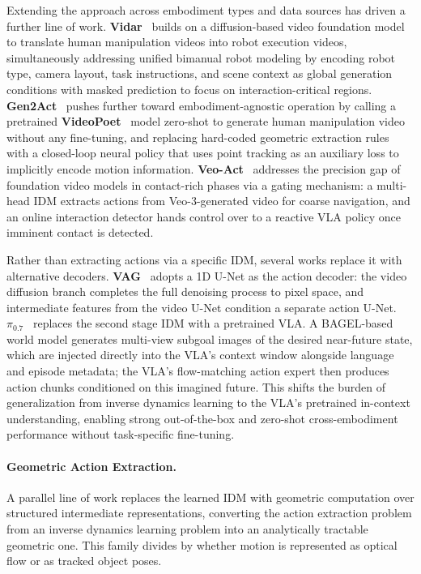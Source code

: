 Extending the approach across embodiment types and data sources has driven a further line of work. \textbf{Vidar}~\cite{vidar} builds on a diffusion-based video foundation model to translate human manipulation videos into robot execution videos, simultaneously addressing unified bimanual robot modeling by encoding robot type, camera layout, task instructions, and scene context as global generation conditions with masked prediction to focus on interaction-critical regions. \textbf{Gen2Act}~\cite{bharadhwaj2024gen2act} pushes further toward embodiment-agnostic operation by calling a pretrained \textbf{VideoPoet}~\cite{VideoPoet} model zero-shot to generate human manipulation video without any fine-tuning, and replacing hard-coded geometric extraction rules with a closed-loop neural policy that uses point tracking as an auxiliary loss to implicitly encode motion information.
\textbf{Veo-Act}~\cite{zhang2026veoact} addresses the precision gap of foundation video models in contact-rich phases via a gating mechanism: a multi-head IDM extracts actions from Veo-3-generated video for coarse navigation, and an online interaction detector hands control over to a reactive VLA policy once imminent contact is detected.

Rather than extracting actions via a specific IDM, several works replace it with alternative decoders. \textbf{VAG}~\cite{lang2026vag} adopts a 1D U-Net as the action decoder: the video diffusion branch completes the full denoising process to pixel space, and intermediate features from the video U-Net condition a separate action U-Net. \textbf{$\pi_{0.7}$}~\cite{pi0.7} replaces the second stage IDM with a pretrained VLA. A BAGEL-based world model \cite{bagel} generates multi-view subgoal images of the desired near-future state, which are injected directly into the VLA's context window alongside language and episode metadata; the VLA's flow-matching action expert then produces action chunks conditioned on this imagined future. This shifts the burden of generalization from inverse dynamics learning to the VLA's pretrained in-context understanding, enabling strong out-of-the-box and zero-shot cross-embodiment performance without task-specific fine-tuning. 



\paragraph{Geometric Action Extraction.}
A parallel line of work replaces the learned IDM with geometric computation over structured intermediate representations, converting the action extraction problem from an inverse dynamics learning problem into an analytically tractable geometric one. This family divides by whether motion is represented as optical flow or as tracked object poses.

